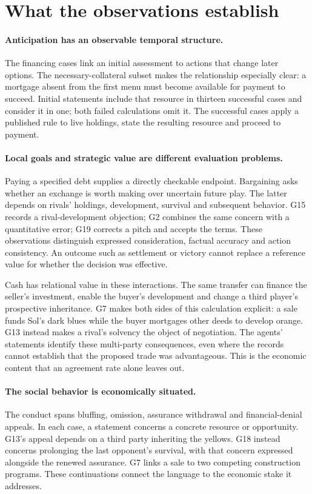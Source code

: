 \section{What the observations establish}
\label{sec:discussion}

\paragraph{Anticipation has an observable temporal structure.}
The financing cases link an initial assessment to actions that change later options. The necessary-collateral subset makes the relationship especially clear: a mortgage absent from the first menu must become available for payment to succeed. Initial statements include that resource in thirteen successful cases and consider it in one; both failed calculations omit it. The successful cases apply a published rule to live holdings, state the resulting resource and proceed to payment.

\paragraph{Local goals and strategic value are different evaluation problems.}
Paying a specified debt supplies a directly checkable endpoint. Bargaining asks whether an exchange is worth making over uncertain future play. The latter depends on rivals' holdings, development, survival and subsequent behavior. G15 records a rival-development objection; G2 combines the same concern with a quantitative error; G19 corrects a pitch and accepts the terms. These observations distinguish expressed consideration, factual accuracy and action consistency. An outcome such as settlement or victory cannot replace a reference value for whether the decision was effective.

Cash has relational value in these interactions. The same transfer can finance the seller's investment, enable the buyer's development and change a third player's prospective inheritance. G7 makes both sides of this calculation explicit: a sale funds Sol's dark blues while the buyer mortgages other deeds to develop orange. G13 instead makes a rival's solvency the object of negotiation. The agents' statements identify these multi-party consequences, even where the records cannot establish that the proposed trade was advantageous. This is the economic content that an agreement rate alone leaves out.

\paragraph{The social behavior is economically situated.}
The conduct spans bluffing, omission, assurance withdrawal and financial-denial appeals. In each case, a statement concerns a concrete resource or opportunity. G13's appeal depends on a third party inheriting the yellows. G18 instead concerns prolonging the last opponent's survival, with that concern expressed alongside the renewed assurance. G7 links a sale to two competing construction programs. These continuations connect the language to the economic stake it addresses.

